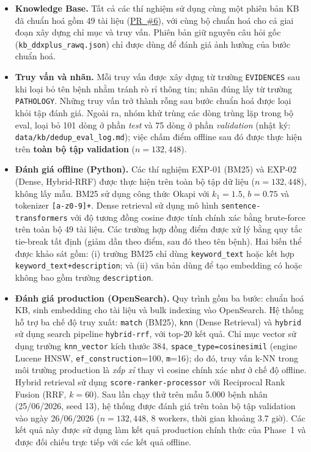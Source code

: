 \begin{itemize}
    \item \textbf{Knowledge Base.} Tất cả các thí nghiệm sử dụng cùng một phiên bản KB đã chuẩn hoá gồm 49 tài liệu (\href{https://github.com/AIVIETNAM-AIO-Lucyna/Disease-Diagnosis-RAG-System/pull/6}{PR~\#6}), với cùng bộ chuẩn hoá cho cả giai đoạn xây dựng chỉ mục và truy vấn. Phiên bản giữ nguyên câu hỏi gốc (\texttt{kb\_ddxplus\_rawq.json}) chỉ được dùng để đánh giá ảnh hưởng của bước chuẩn hoá.

    \item \textbf{Truy vấn và nhãn.} Mỗi truy vấn được xây dựng từ trường \texttt{EVIDENCES} sau khi loại bỏ tên bệnh nhằm tránh rò rỉ thông tin; nhãn đúng lấy từ trường \texttt{PATHOLOGY}. Những truy vấn trở thành rỗng sau bước chuẩn hoá được loại khỏi tập đánh giá. Ngoài ra, nhóm khử trùng các dòng trùng lặp trong bộ eval, loại bỏ 101 dòng ở phần \textit{test} và 75 dòng ở phần \textit{validation} (nhật ký: \texttt{data/kb/dedup\_eval\_log.md}); việc chấm điểm offline sau đó được thực hiện trên \textbf{toàn bộ tập validation} ($n=132{,}448$).

    \item \textbf{Đánh giá offline (Python).} Các thí nghiệm EXP-01 (BM25) và EXP-02 (Dense, Hybrid-RRF) được thực hiện trên toàn bộ tập dữ liệu ($n=132{,}448$), không lấy mẫu. BM25 sử dụng công thức Okapi với $k_1=1.5$, $b=0.75$ và tokenizer \texttt{[a-z0-9]+}. Dense retrieval sử dụng mô hình \texttt{sentence-transformers} với độ tương đồng cosine được tính chính xác bằng brute-force trên toàn bộ 49 tài liệu. Các trường hợp đồng điểm được xử lý bằng quy tắc tie-break tất định (giảm dần theo điểm, sau đó theo tên bệnh). Hai biến thể được khảo sát gồm: (i) trường BM25 chỉ dùng \texttt{keyword\_text} hoặc kết hợp \texttt{keyword\_text+description}; và (ii) văn bản dùng để tạo embedding có hoặc không bao gồm trường \texttt{description}.

    \item \textbf{Đánh giá production (OpenSearch).} Quy trình gồm ba bước: chuẩn hoá KB, sinh embedding cho tài liệu và bulk indexing vào OpenSearch. Hệ thống hỗ trợ ba chế độ truy xuất: \texttt{match} (BM25), \texttt{knn} (Dense Retrieval) và \texttt{hybrid} sử dụng search pipeline \texttt{hybrid-rrf}, với top-$20$ kết quả. Chỉ mục vector sử dụng trường \texttt{knn\_vector} kích thước 384, \texttt{space\_type=cosinesimil} (engine Lucene HNSW, \texttt{ef\_construction}=100, \texttt{m}=16); do đó, truy vấn k-NN trong môi trường production là \emph{xấp xỉ} thay vì cosine chính xác như ở chế độ offline. Hybrid retrieval sử dụng \texttt{score-ranker-processor} với Reciprocal Rank Fusion (RRF, $k=60$). Sau lần chạy thử trên mẫu 5.000 bệnh nhân (25/06/2026, seed 13), hệ thống được đánh giá trên toàn bộ tập validation vào ngày 26/06/2026 ($n=132{,}448$, 8 workers, thời gian khoảng 3.7 giờ). Các kết quả này được sử dụng làm kết quả production chính thức của Phase~1 và được đối chiếu trực tiếp với các kết quả offline.


\end{itemize}
